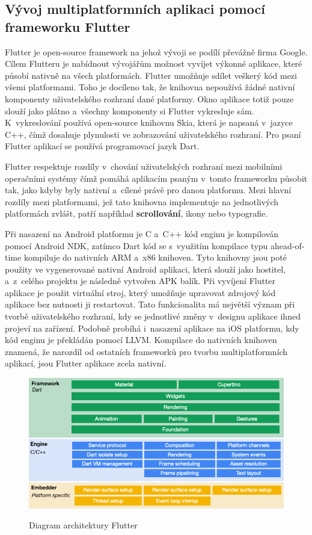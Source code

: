 \documentclass[12pt, a4paper]{article}
\begin{document}
	\subsection{Vývoj multiplatformních aplikaci pomocí frameworku Flutter}
Flutter je open-source framework na jehož vývoji se podílí převážně firma Google. Cílem Flutteru je nabídnout vývojářům možnost vyvíjet výkonné aplikace, které působí nativně na všech platformách. Flutter umožňuje sdílet veškerý kód mezi všemi platformami. Toho je docíleno tak, že knihovna nepoužívá žádné nativní komponenty uživatelského rozhraní dané platformy. Okno aplikace totiž pouze slouží jako plátno a~všechny komponenty si Flutter vykresluje sám. K~vykreslování používá open-source knihovnu Skia, která je napsaná v~jazyce C++, čímž dosahuje plynulosti ve zobrazování uživatelského rozhraní. Pro psaní Flutter aplikací se používá programovací jazyk Dart.

Flutter respektuje rozdíly v~chování uživatelských rozhraní mezi mobilními operačními systémy čímž pomáhá aplikacím psaným v~tomto frameworku působit tak, jako kdyby byly nativní a~cílené právě pro danou platformu. Mezi hlavní rozdíly mezi platformami, jež tato knihovna implementuje na jednotlivých platformách zvlášt, patří například \textbf{scrollování}, ikony nebo typografie.

Při nasazení na Android platformu je C a~C++ kód enginu je kompilován pomocí Android NDK, zatímco Dart kód se s~využitím kompilace typu ahead-of-time kompiluje do nativních ARM a~x86 knihoven. Tyto knihovny jsou poté použity ve vygenerované nativní Android aplikaci, která slouží jako hostitel, a~z~celého projektu je následně vytvořen APK balík. Při vyvíjení Flutter aplikace je použit virtuální stroj, který umožňuje upravovat zdrojový kód aplikace bez nutnosti ji restartovat. Tato funkcionalita má největší význam při tvorbě uživatelského rozhraní, kdy se jednotlivé změny v~designu aplikace ihned projeví na zařízení. Podobně probíhá i~nasazení aplikace na iOS platformu, kdy kód enginu je překládán pomocí LLVM. Kompilace do nativních knihoven znamená, že narozdíl od ostatních frameworků pro tvorbu multiplatformních aplikací, jsou Flutter aplikace zcela nativní.

\begin{figure}[!ht]
\centering
{\includegraphics[width=13.5cm]{img/flutter-architecture.png}}
\caption{Diagram architektury Flutter}
\label{fig:flutter-architecture}
\end{figure}
\end{document}
